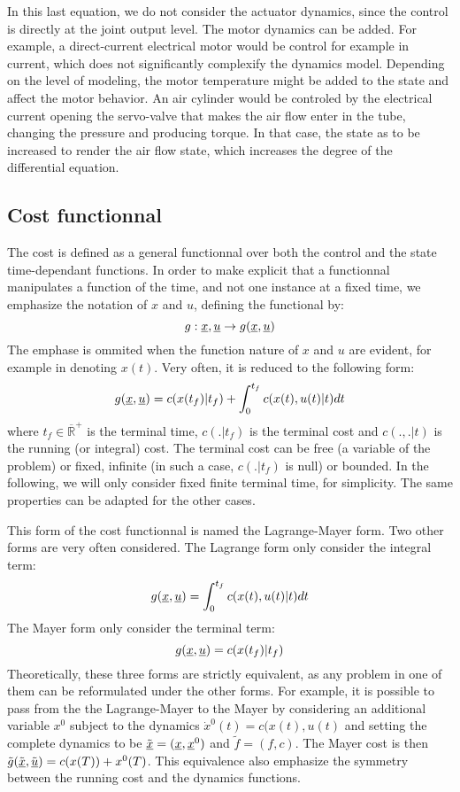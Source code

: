 \documentclass{book}
\begin{document}
In this last equation, we do not consider the actuator dynamics, since the control is directly at the joint output level. The motor dynamics can be added. For example, a direct-current electrical motor would be control for example in current, which does not significantly complexify the dynamics model. Depending on the level of modeling, the motor temperature might be added to the state and affect the motor behavior. An air cylinder would be controled by the electrical current opening the servo-valve that makes the air flow enter in the tube, changing the pressure and producing torque. In that case, the state as to be increased to render the air flow state, which increases the degree of the differential equation. 

\subsection{Cost functionnal}

The cost is defined as a general functionnal over both the control and the state time-dependant functions. In order to make explicit that a functionnal manipulates a function of the time, and not one instance at a fixed time, we emphasize the notation of $x$ and $u$, defining the functional by:
$$ g: \underline{x},\underline{u} \rightarrow g(\underline{x},\underline{u})$$
The emphase is ommited when the function nature of $x$ and $u$ are evident, for example in denoting $x(t)$.
Very often, it is reduced to the following form:
$$ g(\underline{x},\underline{u}) = c(x(t_f)|t_f) + \int_0^{t_f} c(x(t),u(t)|t) dt $$
where $t_f \in \overline{\mathbb{R}}^+$ is the terminal time, $c(.|t_f)$ is the terminal cost and $c(.,.|t)$ is the running (or integral) cost. The terminal cost can be free (\mie a variable of the problem) or fixed, infinite (in such a case, $c(.|t_f)$ is null) or bounded. In the following, we will only consider  fixed finite terminal time, for simplicity. The same properties can be adapted for the other cases.

This form of the cost functionnal is named the Lagrange-Mayer form. Two other forms are very often considered. The Lagrange form only consider the integral term:
$$ g(\underline{x},\underline{u}) = \int_0^{t_f} c(x(t),u(t)|t) dt $$
The Mayer form only consider the terminal term:
$$ g(\underline{x},\underline{u}) = c(x(t_f)|t_f)$$
Theoretically, these three forms are strictly equivalent, as any problem in one of them can be reformulated under the other forms. For example, it is possible to pass from the the Lagrange-Mayer to the Mayer by considering an additional variable $x^0$ subject to the dynamics $\dot x^0(t) = c(x(t),u(t)$ and setting the complete dynamics to be $\tilde{\underline{x}} = (\underline{x},\underline{x}^0)$ and $\tilde f = (f,c)$. The Mayer cost is then $\tilde g(\tilde{\underline{x}},\tilde{\underline{u}}) = c(x(T)) + x^0(T)$. This equivalence also emphasize the symmetry between the running cost and the dynamics functions.
\end{document}
